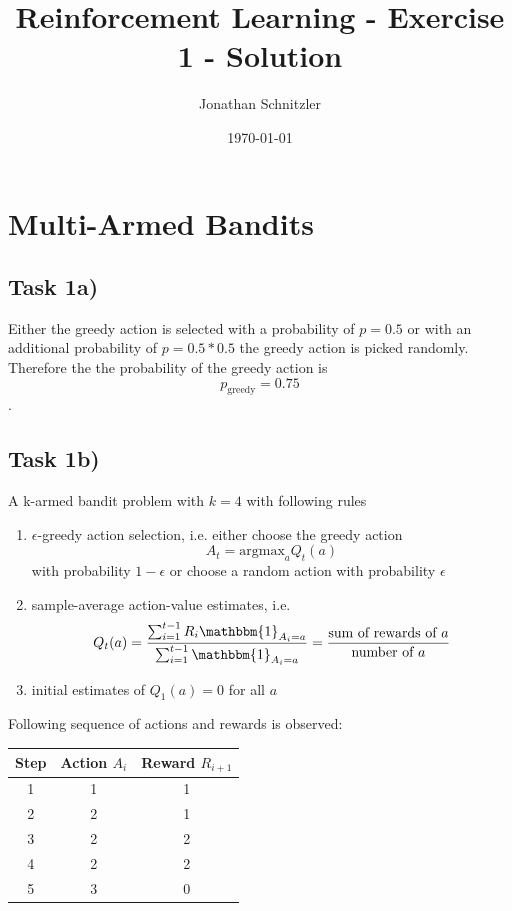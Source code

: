 \documentclass{article}
\title{Reinforcement Learning - Exercise 1 - Solution}
\author{Jonathan Schnitzler}
\date{\today}
\begin{document}
\maketitle
\section{Multi-Armed Bandits}

\subsection*{Task 1a)}

Either the greedy action is selected with a probability of $p = 0.5$ or with an additional probability of $p = 0.5 * 0.5$ the greedy action is picked randomly. Therefore the the probability of the greedy action is 
$$p_{\text{greedy}} = 0.75$$.



\subsection*{Task 1b)}
A k-armed bandit problem with $k=4$ with following rules
\begin{enumerate}
    \item $\epsilon$-greedy action selection, i.e. either choose the greedy action 
    \begin{equation}
        A_t = \text{argmax}_a Q_t(a)
    \end{equation} with probability $1-\epsilon$ or choose a random action with probability $\epsilon$
    \item sample-average action-value estimates, i.e.
    \begin{equation}
        Q_t(a) = \frac{\sum_{i=1}^{t-1}R_i \mathbbm{1}_{A_i = a}}{\sum_{i=1}^{t-1} \mathbbm{1}_{A_i = a}} = \frac{\text{sum of rewards of $a$}}{\text{number of $a$}}
    \end{equation}
    \item initial estimates of $Q_1(a) = 0$ for all $a$
\end{enumerate}

Following sequence of actions and rewards is observed:
\begin{table}[H]
\centering
\begin{tabular}{|c|c|c|}
\hline
Step & Action $A_i$ & Reward $R_{i+1}$ \\ \hline
1 & 1 & 1 \\
2 & 2 & 1 \\
3 & 2 & 2 \\
4 & 2 & 2 \\
5 & 3 & 0 \\
\hline
\end{tabular}
\end{table}
\end{document}
